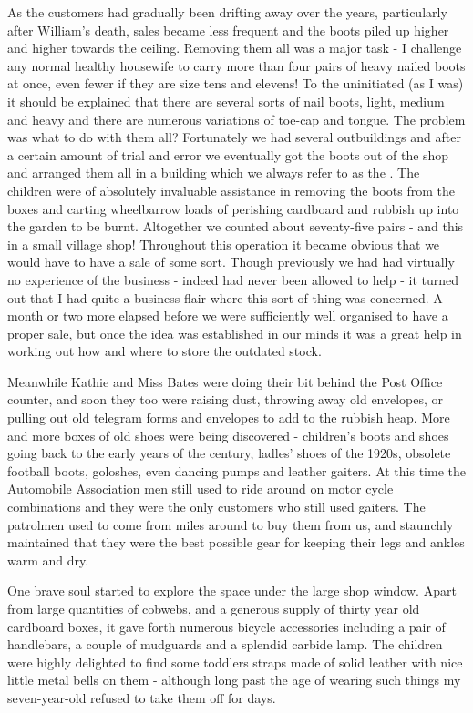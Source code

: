 As the customers had gradually been drifting away over the years, particularly after William's death, sales became less frequent and the boots piled up higher and higher towards the ceiling. Removing them all was a major task - I challenge any normal healthy housewife to carry more than four pairs of heavy nailed boots at once, even fewer if they are size tens and elevens! To the uninitiated (as I was) it should be explained that there are several sorts of	nail boots, light, medium and heavy and there are numerous variations of toe-cap and tongue. The problem was what to do with them all? Fortunately we had several outbuildings and after a certain amount of trial and error we eventually got the boots out of the shop and arranged them all in a building which we always refer to as the . The children were of absolutely invaluable assistance in removing the boots from the boxes and carting wheelbarrow loads of perishing cardboard and rubbish up into the garden to be burnt. Altogether we counted about seventy-five pairs - and this in a small village shop! Throughout this operation it became obvious that we would have to have a sale of some sort. Though previously	we had had virtually no experience of the business - indeed had never been allowed to help - it turned out that I had quite a business flair where this sort of thing was concerned. A month or two more elapsed before we were sufficiently well organised to have a proper sale, but once the idea was established in our minds it was a great help in working out how and where to store the outdated stock.

Meanwhile Kathie and Miss Bates were doing their bit behind the Post Office counter, and soon they too were raising dust, throwing away old envelopes, or pulling out old telegram forms and envelopes to add to the rubbish heap. More and more boxes of old shoes were being discovered - children's boots and shoes going back to the early years of the century, ladles’ shoes of the 1920s, obsolete football boots, goloshes, even dancing pumps and leather gaiters. At this time the Automobile Association men still used to ride around on motor cycle combinations and they were the only customers who still used gaiters. The patrolmen used to come from miles around to buy them from us, and staunchly maintained that they were the best possible gear for keeping their legs and ankles warm and dry.

One brave soul started to explore the space under the large shop window. Apart from large quantities of cobwebs, and a generous supply of thirty year old cardboard boxes, it gave forth numerous bicycle accessories including a pair of handlebars, a couple of mudguards and a splendid carbide lamp. The children were highly delighted to find some toddlers straps made of solid leather with nice little metal bells on them - although long past the age of wearing such things my seven-year-old refused to take them off for days.

